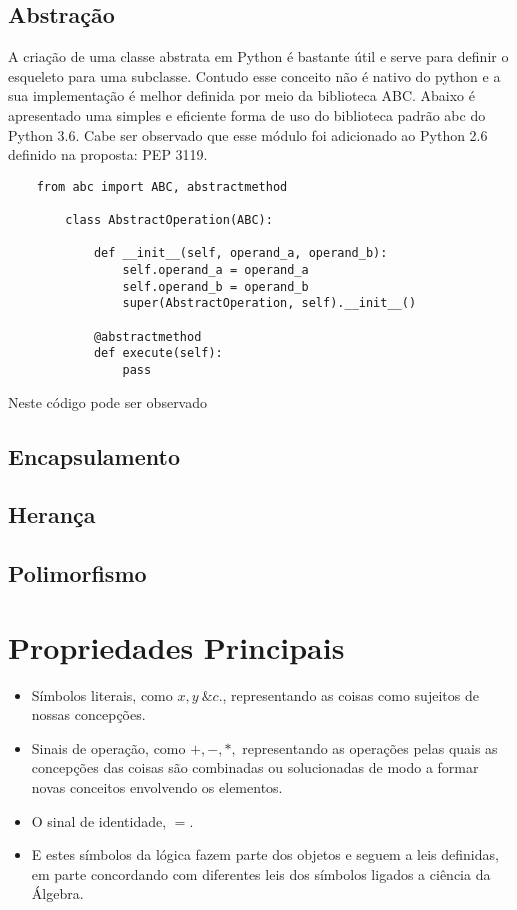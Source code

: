 \documentclass[11pt,a4paper]{article}
\begin{document}
\subsection{Abstração}
A criação de uma classe abstrata em Python é bastante útil e serve para definir o esqueleto para uma subclasse. Contudo  esse conceito não é nativo do python e a sua implementação é melhor definida por meio da biblioteca ABC. Abaixo é apresentado uma simples e eficiente forma de uso do biblioteca padrão abc do Python 3.6. Cabe ser observado que esse módulo foi adicionado ao Python 2.6 definido na proposta: PEP 3119.

\begin{lstlisting}
    from abc import ABC, abstractmethod 
 
        class AbstractOperation(ABC):
 
            def __init__(self, operand_a, operand_b):
                self.operand_a = operand_a
                self.operand_b = operand_b
                super(AbstractOperation, self).__init__()
    
            @abstractmethod
            def execute(self):
                pass
	\end{lstlisting}

Neste código pode ser observado 


\subsection{Encapsulamento}
\subsection{Herança}
\subsection{Polimorfismo}



\vspace{0.9in}
\vspace{0.2in}

\section{Propriedades Principais}


\lipsum[1]

\begin{itemize}
 \item Símbolos literais, como $x, y\ \&c$., representando as coisas como sujeitos de nossas concepções.
 \item Sinais de operação, como $+, -, *,$ representando as operações pelas quais as concepções das coisas são combinadas ou solucionadas de modo a formar novas conceitos envolvendo os elementos.
 \item O sinal de identidade, $=$.
 \item E estes símbolos da lógica fazem parte dos objetos e seguem a leis definidas, em parte concordando com diferentes leis dos símbolos ligados a ciência da Álgebra.
\end{itemize}
\end{document}

